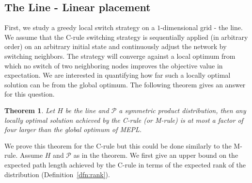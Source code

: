 \documentclass[conference]{IEEEtran}
\def\Pc{\mathcal{P}}
\newtheorem{theorem}{Theorem}
\begin{document}
\subsection{The Line - Linear placement}
First, we study a greedy local switch strategy on a $1$-dimensional grid - the line.
We assume that the C-rule switching strategy is sequentially applied (in arbitrary order) on an arbitrary initial state and continuously adjust the network by switching neighbors. The strategy will converge against a local optimum from which no switch of two neighboring nodes improves the objective value in expectation.
We are interested in quantifying how far such a locally optimal solution can be from the global optimum. The following theorem gives an answer for this question.

\begin{theorem}\label{thm:approx-line}
Let $H$ be the line and $\Pc$ a symmetric product distribution, then any locally optimal solution achieved by the C-rule (or M-rule) is at most a factor of four larger than the global optimum of MEPL.
\end{theorem}

We prove this theorem for the C-rule but this could be done similarly to the M-rule. Assume $H$ and $\Pc$ as in the theorem.
We first give an upper bound on the expected path length achieved by the C-rule in terms of the expected rank of the distribution (Definition~\ref{dfn:rank}).
\end{document}

